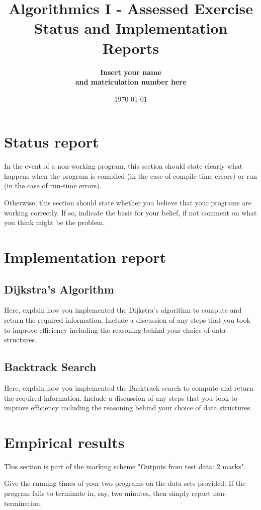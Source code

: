\documentclass{article}
\title{Algorithmics I - Assessed Exercise\\ \vspace{4mm} 
Status and Implementation Reports}
\author{\bf Insert your name\\ \bf and matriculation number here}
\date{\today}
\begin{document}
\maketitle

\section*{Status report}

In the event of a non-working program, this section should state clearly what happens when the program is compiled (in the case of compile-time errors) or run (in the case of run-time errors).  

Otherwise, this section should state whether you believe that your programs are working correctly. If so, indicate the basis for your belief, if not comment on what you think might be the problem.

\section*{Implementation report}

\subsection*{Dijkstra's Algorithm}

Here, explain how you implemented the Dijkstra's algorithm to compute and return the required information. Include a discussion of any steps that you took to improve efficiency including the reasoning behind your choice of data structures.

\subsection*{Backtrack Search}

Here, explain how you implemented the Backtrack search to compute and return the required information. Include a discussion of any steps that you took to improve efficiency including the reasoning behind your choice of data structures.

\section*{Empirical results}

This section is part of the marking scheme "Outputs from test data: 2 marks".

Give the running times of your two programs on the data sets provided. If the program fails to terminate in, say, two minutes, then simply report non-termination. 
\end{document}
